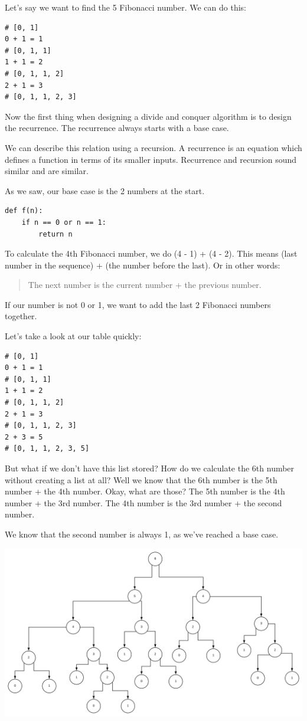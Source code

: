 \documentclass{article}
\begin{document}
Let's say we want to find the 5 Fibonacci number. We can do this:
\begin{verbatim}
# [0, 1]
0 + 1 = 1 
# [0, 1, 1]
1 + 1 = 2 
# [0, 1, 1, 2]
2 + 1 = 3
# [0, 1, 1, 2, 3]

\end{verbatim}
Now the first thing when designing a divide and conquer algorithm is to design the recurrence. The recurrence always starts with a base case.

We can describe this relation using a recursion. A recurrence is an equation which defines a function in terms of its smaller inputs. Recurrence and recursion sound similar and are similar.

As we saw, our base case is the 2 numbers at the start.
\begin{verbatim}
def f(n):
	if n == 0 or n == 1:
    	return n
\end{verbatim}

To calculate the 4th Fibonacci number, we do (4 - 1) + (4 - 2). This means (last number in the sequence) + (the number before the last).  Or in other words:
\begin{quote}
    The next number is the current number + the previous number.
\end{quote}

If our number is not 0 or 1, we want to add the last 2 Fibonacci numbers together.

Let's take a look at our table quickly:
\begin{verbatim}
# [0, 1]
0 + 1 = 1
# [0, 1, 1]
1 + 1 = 2 
# [0, 1, 1, 2]
2 + 1 = 3 
# [0, 1, 1, 2, 3]
2 + 3 = 5
# [0, 1, 1, 2, 3, 5]
\end{verbatim}

But what if we don't have this list stored? How do we calculate the 6th number without creating a list at all? Well we know that the 6th number is the 5th number + the 4th number. Okay, what are those? The 5th number is the 4th number + the 3rd number. The 4th number is the 3rd number + the second number. 

We know that the second number is always 1, as we've reached a base case.

 \includegraphics[width=\textwidth,height=\textheight,keepaspectratio]{fib.png}
 
\end{document}
